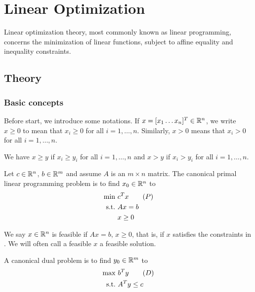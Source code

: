 \setchapterpreamble[u]{\margintoc}
\chapter{Linear Optimization}

Linear optimization theory, most commonly known as linear programming, concerns the minimization of linear functions, subject to affine equality and inequality constraints.

\section{Theory}

\subsection{Basic concepts}

Before start, we introduce some notations.
If $x = [x_1 \dots x_n]^T \in \mathbb{R}^n$, we write $x \ge 0$ to mean that $x_i \ge 0$ for all $i = 1, \dots, n$.
Similarly, $x > 0$ means that $x_i > 0$ for all $i = 1,\dots, n$.

We have $x \ge y$ if $x_i \ge y_i$ for all $i = 1, \dots, n$ and $x > y$ if $x_i > y_i$ for all $i = 1, \dots, n$.

\begin{definition}
Let $c \in \mathbb{R}^n$, $b \in \mathbb{R}^m$ and assume $A$ is an $m \times n$ matrix.
The canonical primal linear programming problem is to find $x_0 \in \mathbb{R}^n$ to
\begin{align}
\min \ & c^T x \tag{$P$} \labeq{LP_P} \\
\st & Ax = b \nonumber \\
& x \ge 0 \nonumber
\end{align}
\end{definition}

\begin{definition}
We say $x \in \mathbb{R}^n$ is feasible if $Ax = b$, $x \ge 0$, that is, if $x$ satisfies the constraints in .
We will often call a feasible $x$ a feasible solution.
\end{definition}

\begin{definition}
A canonical dual problem is to find $y_0 \in \mathbb{R}^m$ to
\begin{align}
\max \ & b^T y \tag{$D$} \labeq{LP_D} \\
\st & A^T y \le c \nonumber
\end{align}
\end{definition}

